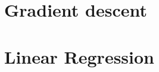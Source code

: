 \documentclass[11pt,twoside,a4paper]{book}
\begin{document}

\tableofcontents 
\chapter{Gradient descent} 


\chapter{Linear Regression}



 
  
\end{document}
